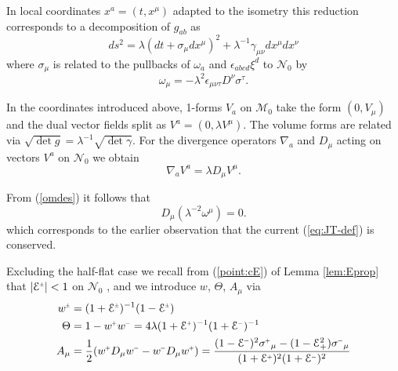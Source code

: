 \documentclass[a4paper,11pt,reqno]{amsart}
\newcommand{\cE}{\mathcal{E}}
\newcommand{\cM}{\mathcal{M}}
\newcommand{\cN}{\mathcal{N}}
\newcommand{\Th}{\Theta}
\theoremstyle{plain}
\renewcommand{\P}[1]{{{#1}^{\hspace{-.5pt}\scaleto{+}{4pt}}}}
\newcommand{\M}[1]{{{#1}^{\hspace{-.5pt}\scaleto{-}{4pt}}}}
\newcommand{\PM}[1]{{{#1}^{\hspace{-.5pt}\scaleto{\pm}{3.5pt}}}}
\numberwithin{equation}{section}
\begin{document}
In local  coordinates $x^{a}=(t,x^{\mu})$ adapted to the isometry this
reduction corresponds to a decomposition of $g_{ab}$ as
\begin{equation}
ds^{2} = \lambda(dt + \sigma_{\mu}dx^{\mu})^{2} + 
\lambda^{-1} \gamma_{\mu\nu} dx^{\mu} dx^{\nu} \label{2ds}
\end{equation}
where $\sigma_{\mu}$ is related to the pullbacks of $\omega_{a}$ and
$\epsilon_{abcd} \xi^{d}$ to $\cN_0$ by
\begin{equation}
\omega_{\mu} = - \lambda^{2} \epsilon_{\mu\nu\tau} D^{\nu} \sigma^{\tau}.
\label{omdes}
\end{equation}



In the coordinates introduced above, 1-forms $V_{a}$  on $\cM_0$ take the form
$(0, V_{\mu})$ and the dual vector fields split as $V^{a} = (0, \lambda V^{\mu})$.
The volume forms are related via 
$\sqrt{ \det g} = \lambda^{-1}  \sqrt{\det \gamma}$.
For the divergence operators $\nabla_a$ and $D_{\mu}$ acting on vectors  $V^a$ on $\cN_0$ we obtain 
\begin{equation}
\nabla_{a} V^{a} =  \lambda D_{\mu}  V^{\mu}.
\end{equation} 

%
%
%
%
%

%
From (\ref{omdes}) it  follows that
\begin{equation}
\label{divom}
D_{\mu} (\lambda^{-2} \omega^{\mu}) = 0.
\end{equation}
which corresponds to the earlier observation that the current (\ref{eq:JT-def}) is conserved.

Excluding the half-flat case we recall from (\ref{point:cE}) of Lemma \ref{lem:Eprop} that  $|\PM{\cE}| < 1$ 
on $\cN_0$ , and  we introduce $w$, $\Th$, $A_{\mu}$ via
\begin{align}
 \label{w}
\PM{w} ={}& (1+ \PM{\cE})^{-1}(1 -  \PM{\cE})  \\
\Theta ={}& 1 - \P{w}\M{w} =  4 \lambda (1 + \P{\cE})^{-1} (1 + \M{\cE})^{-1} \label{Th} \\
  A_{\mu} ={}& \frac{1}{2}(\P{w}D_{\mu}\M{w}-\M{w}D_{\mu}\P{w}) = \frac{(1 - \M{\cE})^2 \P{\sigma}_{\mu} - (1 - \cE_+^2) \M{\sigma}_{\mu}}
{(1 + \P{\cE})^2 (1 + \M{\cE})^2}
\label{A}
\end{align}
\end{document}
